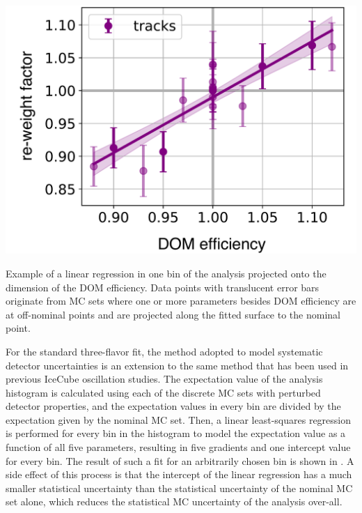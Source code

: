 \begin{marginfigure}[\baselineskip]
    \includegraphics[width=\linewidth]{figures/measurement/systematics/detector/hypersurface_example_v2.pdf} 
    \caption{Example of a linear regression in one bin of the analysis projected onto the dimension of the DOM efficiency. Data points with translucent error bars originate from MC sets where one or more parameters besides DOM efficiency are at off-nominal points and are projected along the fitted surface to the nominal point.}
\end{marginfigure}
For the standard three-flavor fit, the method adopted to model systematic detector uncertainties is an extension to the same method that has been used in previous IceCube oscillation studies\cite{IceCube:2019dqi}. The expectation value of the analysis histogram is calculated using each of the discrete MC sets with perturbed detector properties, and the expectation values in every bin are divided by the expectation given by the nominal MC set. Then, a linear least-squares regression is performed for every bin in the histogram to model the expectation value as a function of all five parameters, resulting in five gradients and one intercept value for every bin. The result of such a fit for an arbitrarily chosen bin is shown in . A side effect of this process is that the intercept of the linear regression has a much smaller statistical uncertainty than the statistical uncertainty of the nominal MC set alone, which reduces the statistical MC uncertainty of the analysis over-all.

